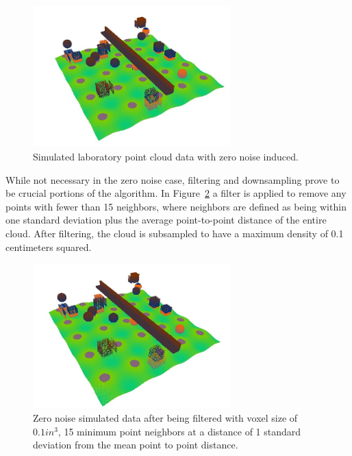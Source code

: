 \documentclass[12pt]{drexelthesis}
\begin{document}
\begin{figure}[!ht]
		\centering
		\includegraphics[width=3in]{simulated-lab-scan/0noise/sim-lab-0noise.jpg}
		\caption[Simulated laboratory point cloud data with zero noise induced]{\centering Simulated laboratory point cloud data with zero noise induced.}
	\label{zeronoise:raw}
\end{figure}


While not necessary in the zero noise case, filtering and downsampling prove to be crucial portions of the algorithm. In Figure~\ref{zeronoise:filtered} a filter is applied to remove any points with fewer than 15 neighbors, where neighbors are defined as being within one standard deviation plus the average point-to-point distance of the entire cloud. After filtering, the cloud is subsampled to have a maximum density of 0.1 centimeters squared.


\begin{figure}[!ht]
	\centering
		\includegraphics[width=3in]{simulated-lab-scan/0noise/sim-lab-0noise-DS01-k15std1.jpg}
		\caption[Zero noise simulated data after being filtered with voxel size of 0.1 $in^{3}$, 15 minimum point neighbors at a distance of 1 standard deviation from the mean point to point distance]{\centering Zero noise simulated data after being filtered with voxel size of $0.1 in^{3}$, 15 minimum point neighbors at a distance of 1 standard deviation from the mean point to point distance.}
	\label{zeronoise:filtered}
\end{figure}
\end{document}

